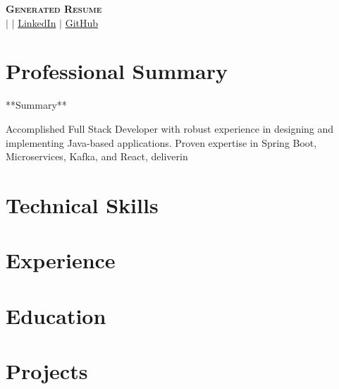 \documentclass[letterpaper,11pt]{article}
\newcommand{\resumeSubHeadingListStart}{\begin{itemize}[leftmargin=0.15in, label={}]}
\newcommand{\resumeSubHeadingListEnd}{\end{itemize}}
\begin{document}
\begin{center}
    \textbf{\Huge \scshape Generated Resume} \\ \vspace{1pt}
    \small  $|$ \href{mailto:}{} $|$ 
    \href{}{LinkedIn} $|$
    \href{}{GitHub}
\end{center}

\section{Professional Summary}
\small{**Summary**

Accomplished Full Stack Developer with robust experience in designing and implementing Java-based applications. Proven expertise in Spring Boot, Microservices, Kafka, and React, deliverin}

\section{Technical Skills}
 \begin{itemize}[leftmargin=0.15in, label={}]
    \small{\item{
     
    }}
 \end{itemize}

\section{Experience}
  \resumeSubHeadingListStart
    
  \resumeSubHeadingListEnd

\section{Education}
  \resumeSubHeadingListStart
    
  \resumeSubHeadingListEnd

\section{Projects}
    \resumeSubHeadingListStart
      
    \resumeSubHeadingListEnd

\end{document}
